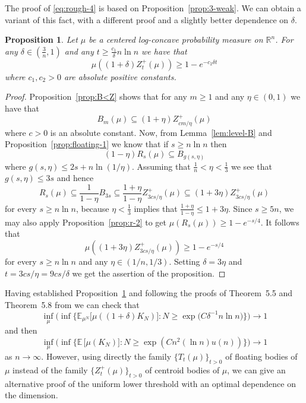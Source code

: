 \documentclass[11pt,leqno]{article}
\newtheorem{proposition}[theorem]{Proposition}
\theoremstyle{definition}
\theoremstyle{remark}
\numberwithin{equation}{section}
\newcommand{\ls}{\leqslant}
\newcommand{\gr}{\geqslant}
\newcommand{\1}{\textbf{1}}
\begin{document}
The proof of \eqref{eq:rough-4} is based on Proposition~\ref{prop:3-weak}. We
can obtain a variant of this fact, with a different proof and a slightly better dependence on $\delta$.

\begin{proposition}\label{prop:3}Let $\mu $ be a centered log-concave probability measure on ${\mathbb R}^n$.
For any $\delta\in \left(\frac{3}{n},1\right)$
and any $t\gr \frac{c_1}{\delta}n\ln n$ we have that
$$\mu ((1+\delta )Z_t^+(\mu ))\gr 1-e^{-c_2\delta t}$$
where $c_1,c_2>0$ are absolute positive constants.
\end{proposition}

\begin{proof}Proposition~\ref{prop:B<Z} shows that for any $m\gr 1$ and any $\eta\in (0,1)$ we have that
\begin{equation*}B_m(\mu) \subseteq (1+\eta)Z_{cm/\eta}^+(\mu)\end{equation*}
where $c>0$ is an absolute constant. Now, from Lemma~\ref{lem:level-B} and Proposition~\ref{prop:floating-1} we know that if $s\gr n\ln n$ then
$$(1-\eta)R_s(\mu)\subseteq B_{g(s,\eta)}$$
where $g(s,\eta)\ls 2s+n\ln(1/\eta)$. Assuming that $\frac{1}{n}<\eta<\frac{1}{3}$ we see that
$g(s,\eta)\ls 3s$ and hence
$$R_s(\mu)\subseteq\frac{1}{1-\eta}B_{3s}\subseteq \frac{1+\eta}{1-\eta}Z_{3cs/\eta}^+(\mu)
\subseteq (1+3\eta)Z_{3cs/\eta}^+(\mu)$$
for every $s\gr n\ln n$, because $\eta<\frac{1}{3}$ implies that $\frac{1+\eta}{1-\eta}\ls 1+3\eta$.
Since $s\gr 5n$, we may also apply Proposition~\ref{prop:r-2} to get $\mu(R_s(\mu ))\gr 1-e^{-s/4}$.
It follows that
$$\mu((1+3\eta)Z_{3cs/\eta}^+(\mu))\gr 1-e^{-s/4}$$
for every $s\gr n\ln n$ and any $\eta\in (1/n,1/3)$. Setting $\delta=3\eta$ and $t=3cs/\eta=9cs/\delta$
we get the assertion of the proposition. \end{proof}

Having established Proposition~\ref{prop:3} and following the proofs of Theorem~5.5 and Theorem~5.8 from
\cite{BGP-depth} we can check that
\begin{equation}\label{eq:rough-6}\inf_{\mu }\Big(\inf\Big\{ {\mathbb E}_{\mu^N}\big[\mu ((1+\delta )K_N)\big]: N\gr \exp \big (C\delta^{-1}n\ln n\big )\Big\}\Big)\longrightarrow 1\end{equation}
and then
\begin{equation}\label{eq:rough-7}\inf_{\mu }\Big(\inf\Big\{ {\mathbb E}\,\big[\mu (K_N)\big]: N\gr \exp (Cn^2(\ln n)u(n))\Big\}\Big)\longrightarrow 1\end{equation}
as $n\to\infty$. However, using directly the family $\{T_t(\mu)\}_{t>0}$ of floating bodies of $\mu$ instead of
the family $\{Z_t^+(\mu)\}_{t>0}$ of centroid bodies of $\mu$, we can give an alternative
proof of the uniform lower threshold with an optimal dependence on the dimension.
\end{document}
